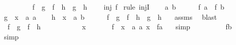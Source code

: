 \begin{isabellebody}
\ \ \ \ \ \ \ \ \ {\isacharparenleft}f\ {\isasymcirc}\ g\ {\isacharequal}\ f\ {\isasymcirc}\ h\ {\isasymlongrightarrow}\ g\ {\isacharequal}\ h{\isacharparenright}{\isachardoublequoteclose}\isanewline
\ \ \ {\isachardoublequoteopen}\ inj\ f{\isachardoublequoteclose}\isanewline
%
\isadelimproof
%
\endisadelimproof
%
\isatagproof
{}\isamarkupfalse%
\ {\isacharparenleft}rule\ injI{\isacharparenright}\isanewline
\ \ \isamarkupfalse%
\ a\ b\ \isanewline
\ \ \isamarkupfalse%
\ {}{\isacharcolon}\ {\isachardoublequoteopen}f\ a\ {\isacharequal}\ f\ b\ {\isachardoublequoteclose}\isanewline
\ \ \isamarkupfalse%
\ {\isacharquery}g\ {\isacharequal}\ {\isachardoublequoteopen}{\isasymlambda}x\ {\isacharcolon}{\isacharcolon}\ {\isacharprime}a{\isachardot}\ a{\isachardoublequoteclose}\isanewline
\ \ \isamarkupfalse%
\ {\isacharquery}h\ {\isacharequal}\ {\isachardoublequoteopen}{\isasymlambda}x\ {\isacharcolon}{\isacharcolon}\ {\isacharprime}a{\isachardot}\ b{\isachardoublequoteclose}\isanewline
\ \ \isamarkupfalse%
\ {}{\isacharcolon}\ {\isachardoublequoteopen}\ {\isacharparenleft}f\ {\isasymcirc}\ {\isacharquery}g\ {\isacharequal}\ f\ {\isasymcirc}\ {\isacharquery}h\ {\isasymlongrightarrow}\ {\isacharquery}g\ {\isacharequal}\ {\isacharquery}h{\isacharparenright}{\isachardoublequoteclose}\ \ \isamarkupfalse%
\ assms\ \isamarkupfalse%
\ blast\isanewline
\ \ \isamarkupfalse%
\ {}{\isacharcolon}\ {\isachardoublequoteopen}f\ {\isasymcirc}\ {\isacharquery}g\ {\isacharequal}\ f\ {\isasymcirc}\ {\isacharquery}h{\isachardoublequoteclose}\ \isanewline
\ \ \isamarkupfalse%
\ \isanewline
\ \ \ \ \isamarkupfalse%
\ x\isanewline
\ \ \ \ \isamarkupfalse%
\ {\isachardoublequoteopen}\ {\isacharparenleft}f\ {\isasymcirc}\ {\isacharparenleft}{\isasymlambda}x\ {\isacharcolon}{\isacharcolon}\ {\isacharprime}a{\isachardot}\ a{\isacharparenright}{\isacharparenright}\ x\ {\isacharequal}\ f{\isacharparenleft}a{\isacharparenright}\ {\isachardoublequoteclose}\ \isamarkupfalse%
\ simp\isanewline
\ \ \ \ \isamarkupfalse%
\ \isamarkupfalse%
\ {\isachardoublequoteopen}{\isachardot}{\isachardot}{\isachardot}\ {\isacharequal}\ f{\isacharparenleft}b{\isacharparenright}{\isachardoublequoteclose}\ \isamarkupfalse%
\ {}\ \isamarkupfalse%
\ simp\isanewline
\ \ \ \ \isamarkupfalse%

\end{isabellebody}
